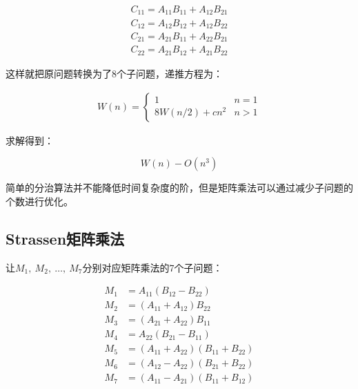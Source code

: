 \vspace{-1cm}

\begin{align*}
    C_{11} = A_{11}B_{11} + A_{12}B_{21} \\
    C_{12} = A_{12}B_{12} + A_{12}B_{22} \\
    C_{21} = A_{21}B_{11} + A_{22}B_{21} \\
    C_{22} = A_{21}B_{12} + A_{21}B_{22}
\end{align*}

这样就把原问题转换为了8个子问题，递推方程为：

\vspace{-0.5cm}

\begin{align*}
    W(n) = \begin{cases}
        1              & n = 1 \\
        8W(n/2) + cn^2 & n > 1
    \end{cases}
\end{align*}

求解得到：

\vspace{-0.5cm}

$$
    W(n) - O(n^3)
$$

简单的分治算法并不能降低时间复杂度的阶，但是矩阵乘法可以通过减少子问题的个数进行优化。

\subsection{Strassen矩阵乘法}

让$  M_1,\ M_2,\ \dots,\ M_7 $分别对应矩阵乘法的7个子问题：

\vspace{-0.5cm}

\begin{align*}
    M_1 & = A_{11}(B_{12} - B_{22})            \\
    M_2 & = (A_{11} + A_{12})B_{22}            \\
    M_3 & = (A_{21} + A_{22})B_{11}            \\
    M_4 & = A_{22}(B_{21} - B_{11})            \\
    M_5 & = (A_{11} + A_{22})(B_{11} + B_{22}) \\
    M_6 & = (A_{12} - A_{22})(B_{21} + B_{22}) \\
    M_7 & = (A_{11} - A_{21})(B_{11} + B_{12})
\end{align*}

